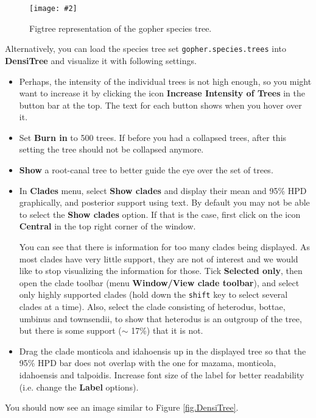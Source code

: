 \documentclass{article}
\newcommand{\includeimage}[2][]{%
\texttt{[image: \#2]}
}
\begin{document}
\begin{figure}[h]
\centering
\includeimage[width=0.95\textwidth]{figures/FigTree}
\caption{\label{fig.figtree} Figtree representation of the gopher species tree.}
\end{figure}

Alternatively, you can load the species tree set \texttt{gopher.species.trees} into {\bf DensiTree} and visualize it with following settings.

\begin{itemize}
\item Perhaps, the intensity of the individual trees is not high enough, so you might want to increase it by clicking the icon {\bf Increase Intensity of Trees} in the button bar at the top. The text for each button shows when you hover over it. 
\item Set {\bf Burn in} to 500 trees. If before you had a collapsed trees, after this setting the tree should not be collapsed anymore.
\item {\bf Show} a root-canal tree to better guide the eye over the set of trees. 
\item In {\bf Clades} menu, select {\bf Show clades} and display their mean and 95\% HPD graphically, and posterior support using text. By default you may not be able to select the {\bf Show clades} option. If that is the case, first click on the icon {\bf Central} in the top right corner of the window.

You can see that there is information for too many clades being displayed. As most clades have very little support, they are not of interest and we would like to stop visualizing the information for those. Tick {\bf Selected only}, then open the clade toolbar (menu {\bf Window/View clade toolbar}), and select only highly supported clades (hold down the \texttt{shift} key to select several clades at a time). Also, select the clade consisting of heterodus, bottae, umbinus and townsendii, to show that heterodus is an outgroup of the tree,
but there is some support ($\sim$ 17\%) that it is not.

\item Drag the clade monticola and idahoensis up in the displayed tree so that the 95\% HPD bar does not overlap with the one for mazama, monticola, idahoensis and talpoidis. Increase font size of the label for better readability (i.e. change the {\bf Label} options).
\end{itemize}

You should now see an image similar to Figure \ref{fig.DensiTree}.
\end{document}

